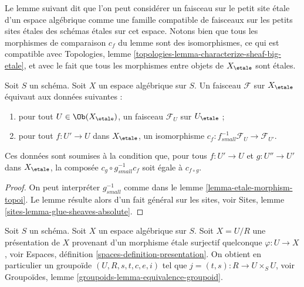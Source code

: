 \noindent
Le lemme suivant dit que l'on peut considérer un faisceau sur le petit
site \'etale d'un espace algébrique comme une famille compatible de faisceaux
sur les petits sites \'etales des schémas \'etales sur cet espace. Notons bien
que tous les morphismes de comparaison $c_f$ du lemme sont des isomorphismes,
ce qui est compatible avec
Topologies, lemme \ref{topologies-lemma-characterize-sheaf-big-etale},
et avec le fait que tous les morphismes entre objets de $X_\etale$
sont \'etales.

\begin{lemma}
\label{lemma-characterize-sheaf-small-etale}
Soit $S$ un schéma. Soit $X$ un espace algébrique sur $S$.
Un faisceau $\mathcal{F}$ sur $X_\etale$ équivaut aux données suivantes :
\begin{enumerate}
\item pour tout $U \in \Ob(X_\etale)$, un faisceau
$\mathcal{F}_U$ sur $U_\etale$ ;
\item pour tout $f : U' \to U$ dans $X_\etale$, un isomorphisme
$c_f : f_{small}^{-1}\mathcal{F}_U \to \mathcal{F}_{U'}$.
\end{enumerate}
Ces données sont soumises à la condition que, pour tous $f : U' \to U$
et $g : U'' \to U'$ dans $X_\etale$, la composée
$c_g \circ g_{small}^{-1} c_f$ soit égale à $c_{f \circ g}$.
\end{lemma}

\begin{proof}
On peut interpréter $g_{small}^{-1}$ comme dans le lemme \ref{lemma-etale-morphism-topoi}.
Le lemme résulte alors d'un fait général sur les sites, voir
Sites, lemme \ref{sites-lemma-glue-sheaves-absolute}.
\end{proof}

\noindent
Soit $S$ un schéma. Soit $X$ un espace algébrique sur $S$.
Soit $X = U/R$ une présentation de $X$ provenant d'un morphisme
\'etale surjectif quelconque $\varphi : U \to X$, voir
Espaces, définition \ref{spaces-definition-presentation}.
On obtient en particulier un groupoïde $(U, R, s, t, c, e, i)$ tel que
$j = (t, s) : R \to U \times_S U$, voir
Groupoïdes, lemme \ref{groupoids-lemma-equivalence-groupoid}.

